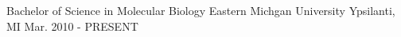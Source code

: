 


\begin{cventries}


\cventry
{Bachelor of Science in Molecular Biology} %
{Eastern Michgan University} %
{Ypsilanti, MI} %
{Mar. 2010 - PRESENT} %
{ }%


\end{cventries}